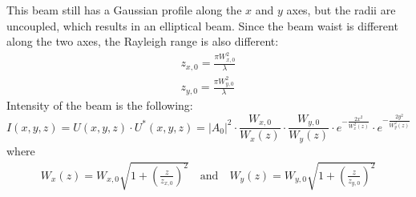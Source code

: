       This beam still has a Gaussian profile along the $x$ and $y$ axes, but the radii are uncoupled, which results in an elliptical beam. Since the beam waist is different along the two axes, the Rayleigh range is also different:
      \begin{align}
        z_{x,0} = \frac{\pi W_{x,0}^2}{\lambda} \\
        z_{y,0} = \frac{\pi W_{y,0}^2}{\lambda}
      \end{align}
      Intensity of the beam is the following:
      \begin{equation}
        I(x,y,z) = U(x,y,z)\cdot U^*(x,y,z) = |A_0|^2 \cdot \frac{W_{x,0}}{W_x(z)} \cdot \frac{W_{y,0}}{W_y(z)} \cdot e^{-\frac{2x^2}{W_x^2(z)}} \cdot e^{-\frac{2y^2}{W_y^2(z)}}
      \end{equation}
      where
      \begin{align}
        W_x(z) = W_{x,0}\sqrt{1+\left( \frac{z}{z_{x,0}} \right)^2}\mathrm{\quad and \quad } W_y(z) = W_{y,0}\sqrt{1+\left( \frac{z}{z_{y,0}} \right)^2}
      \end{align}
      
